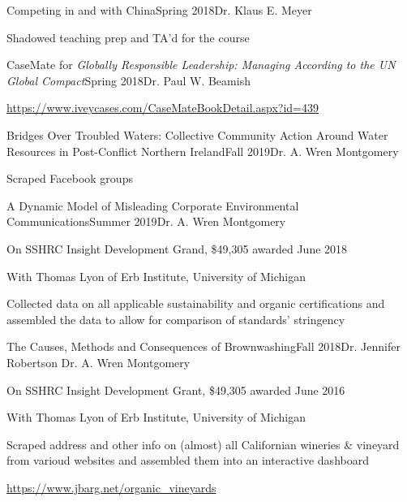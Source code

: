\documentclass{gradstudentresume}
\begin{document}
	\begin{desc}{Competing in and with China}{Spring 2018}{Dr. Klaus E. Meyer}
		\item Shadowed teaching prep and TA'd for the course
	\end{desc}

	\begin{desc}{CaseMate for \textit{Globally Responsible Leadership: Managing According to the UN Global Compact}}{Spring 2018}{Dr. Paul W. Beamish}
		\item \url{https://www.iveycases.com/CaseMateBookDetail.aspx?id=439}
	\end{desc}



	\largespace
	\begin{desc}{Bridges Over Troubled Waters: Collective Community Action Around Water Resources in Post-Conflict Northern Ireland}{Fall 2019}{Dr. A. Wren Montgomery}
		\item Scraped Facebook groups
	\end{desc}

	\begin{desc}{A Dynamic Model of Misleading Corporate Environmental Communications}{Summer 2019}{Dr. A. Wren Montgomery}
		\item On SSHRC Insight Development Grand, \$49,305 awarded June 2018
		\item With Thomas Lyon of Erb Institute, University of Michigan
		\item Collected data on all applicable sustainability and organic certifications and assembled the data to allow for comparison of standards’ stringency
	\end{desc}

	\begin{desc}{The Causes, Methods and Consequences of Brownwashing}{Fall 2018}{Dr. Jennifer Robertson  Dr. A. Wren Montgomery}
		\item On SSHRC Insight Development Grant, \$49,305 awarded June 2016
		\item With Thomas Lyon of Erb Institute, University of Michigan
		\item Scraped address and other info on (almost) all Californian wineries \& vineyard from varioud websites and assembled them into an interactive dashboard
		\item \url{https://www.jbarg.net/organic_vineyards}
	\end{desc}
\end{document}
